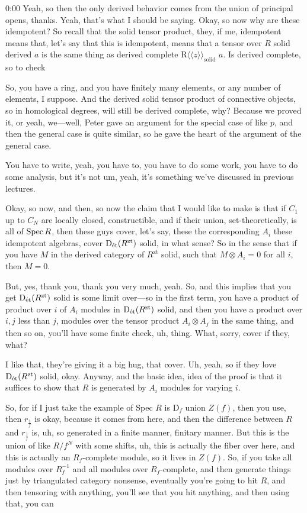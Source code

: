 \begin{unfinished}{0:00}
Yeah, so then the only derived behavior comes from the union of principal opens, thanks. Yeah, that's what I should be saying. Okay, so now why are these idempotent? So recall that the solid tensor product, they, if me, idempotent means that, let's say that this is idempotent, means that a tensor over $R$ solid derived $a$ is the same thing as derived complete $\mathrm{R}\langle\langle z\rangle\rangle_\mathrm{solid}$ $a$. Is derived complete, so to check

So, you have a ring, and you have finitely many elements, or any number of elements, I suppose. And the derived solid tensor product of connective objects, so in homological degrees, will still be derived complete, why? Because we proved it, or yeah, we---well, Peter gave an argument for the special case of like $p$, and then the general case is quite similar, so he gave the heart of the argument of the general case. 

You have to write, yeah, you have to, you have to do some work, you have to do some analysis, but it's not um, yeah, it's something we've discussed in previous lectures.

Okay, so now, and then, so now the claim that I would like to make is that if $C_1$ up to $C_N$ are locally closed, constructible, and if their union, set-theoretically, is all of $\operatorname{Spec} R$, then these guys cover, let's say, these the corresponding $A_i$ these idempotent algebras, cover $\mathrm{D}_{\text{\'et}}(R^\mathrm{zt})$ solid, in what sense? So in the sense that if you have $M$ in the derived category of $R^\mathrm{zt}$ solid, such that $M \otimes A_i = 0$ for all $i$, then $M = 0$.

But, yes, thank you, thank you very much, yeah. So, and this implies that you get $\mathrm{D}_{\text{\'et}}(R^\mathrm{zt})$ solid is some limit over---so in the first term, you have a product of product over $i$ of $A_i$ modules in $\mathrm{D}_{\text{\'et}}(R^\mathrm{zt})$ solid, and then you have a product over $i, j$ less than $j$, modules over the tensor product $A_i \otimes A_j$ in the same thing, and then so on, you'll have some finite check, uh, thing. What, sorry, cover if they, what?

I like that, they're giving it a big hug, that cover. Uh, yeah, so if they love $\mathrm{D}_{\text{\'et}}(R^\mathrm{zt})$ solid, okay. Anyway, and the basic idea, idea of the proof is that it suffices to show that $R$ is generated by $A_i$ modules for varying $i$.

So, for if I just take the example of Spec $R$ is $\mathrm{D}_f$ union $Z(f)$, then you use, then $r_{\frac{1}{f}}$ is okay, because it comes from here, and then the difference between $R$ and $r_{\frac{1}{f}}$ is, uh, so generated in a finite manner, finitary manner. But this is the union of like $R/f^N$ with some shifts, uh, this is actually the fiber over here, and this is actually an $R_f$-complete module, so it lives in $Z(f)$. So, if you take all modules over $R_f^{-1}$ and all modules over $R_f$-complete, and then generate things just by triangulated category nonsense, eventually you're going to hit $R$, and then tensoring with anything, you'll see that you hit anything, and then using that, you can


\end{unfinished}
